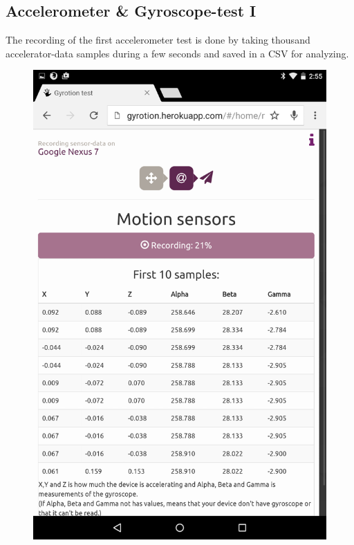 \subsection{Accelerometer \& Gyroscope-test I}
The recording of the first accelerometer test is done by taking thousand accelerator-data samples during a few seconds and saved in a CSV for analyzing.
\begin{figure}[H]
  \hspace{-2cm}
  \centering
  \begin{minipage}[c]{.23\textwidth}
    \centering
    \includegraphics[scale=0.1]{img/Nexus-rec}
  \end{minipage}
  \hspace{2cm}

\end{figure}
